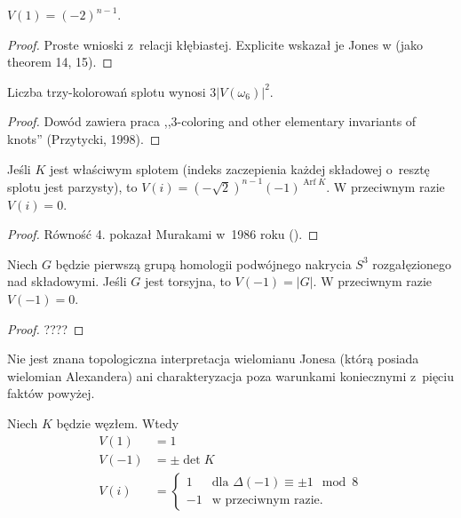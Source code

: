 \begin{proposition}
    $V(1) = (-2)^{n-1}$.
\end{proposition}

\begin{proof}
    Proste wnioski z~relacji kłębiastej.
    Explicite wskazał je Jones w \cite{jones85} (jako theorem 14, 15).
\end{proof}

\begin{proposition}
    Liczba trzy-kolorowań splotu wynosi $3|V(\omega_6)|^2$.
\end{proposition}

\begin{proof}
    Dowód zawiera praca ,,3-coloring and other elementary invariants of knots'' (Przytycki, 1998).
\end{proof}

\begin{proposition}
    Jeśli $K$ jest właściwym splotem (indeks zaczepienia każdej składowej o~resztę splotu jest parzysty), to $V(i) = (-\sqrt 2)^{n-1}(-1)^{\operatorname{Arf} K}$.
    W przeciwnym razie $V(i) = 0$.
\end{proposition}

\begin{proof}
    Równość 4. pokazał Murakami w~1986 roku (\cite{murakami86}).
\end{proof}

\begin{proposition}
    Niech $G$ będzie pierwszą grupą homologii podwójnego nakrycia $S^3$ rozgałęzionego nad składowymi.
    Jeśli $G$ jest torsyjna, to $V(-1) = |G|$.
    W przeciwnym razie $V(-1) = 0$.
\end{proposition}

\begin{proof}
    ????
\end{proof}

Nie jest znana topologiczna interpretacja wielomianu Jonesa (którą posiada wielomian Alexandera) ani charakteryzacja poza warunkami koniecznymi z~pięciu faktów powyżej.

\begin{corollary}
    Niech $K$ będzie węzłem.
    Wtedy
    \begin{align}
        V(1) & = 1 \\
        V(-1) & = \pm \det K \\
        V(i) & = \begin{cases}
            1 & \text{dla } \Delta(-1) \equiv \pm 1 \mod 8 \\
            -1 & \text{w przeciwnym razie.}
        \end{cases}
    \end{align}
\end{corollary}


